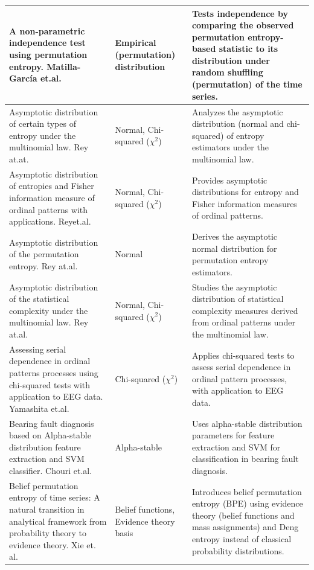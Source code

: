 \documentclass[12pt,a4paper]{article}
\begin{document}
\begin{longtable}{|p{5.5cm}|p{2.5cm}|p{6.5cm}|}
	A non-parametric independence test using permutation entropy. Matilla-García et.al.~\cite{MatillaGarcia2008} & Empirical (permutation) distribution & Tests independence by comparing the observed permutation entropy-based statistic to its distribution under random shuffling (permutation) of the time series.\\
	\hline
	Asymptotic distribution of certain types of entropy under the multinomial law. Rey at.at.~\cite{Rey2023} & Normal, Chi-squared ($\chi^2$) & Analyzes the asymptotic distribution (normal and chi-squared) of entropy estimators under the multinomial law. \\
	\hline
	Asymptotic distribution of entropies and Fisher information measure of ordinal patterns with applications. Reyet.al.~\cite{Rey2024} & Normal, Chi-squared ($\chi^2$) & Provides asymptotic distributions for entropy and Fisher information measures of ordinal patterns. \\
	\hline
	Asymptotic distribution of the permutation entropy. Rey at.al.~\cite{Rey2023a} & Normal & Derives the asymptotic normal distribution for permutation entropy estimators. \\
	\hline
	Asymptotic distribution of the statistical complexity under the multinomial law. Rey at.al.~\cite{Rey2025} & Normal, Chi-squared ($\chi^2$) & Studies the asymptotic distribution of statistical complexity measures derived from ordinal patterns under the multinomial law. \\
	\hline
	Assessing serial dependence in ordinal patterns processes using chi-squared tests with application to EEG data. Yamashita et.al.~\cite{YamashitaRiosDeSousa2022} & Chi-squared ($\chi^2$) & Applies chi-squared tests to assess serial dependence in ordinal pattern processes, with application to EEG data. \\
	\hline
	Bearing fault diagnosis based on Alpha-stable distribution feature extraction and SVM classifier. Chouri et.al.~\cite{Chouri2014} & Alpha-stable & Uses alpha-stable distribution parameters for feature extraction and SVM for classification in bearing fault diagnosis. \\
	\hline
	Belief permutation entropy of time series: A natural transition in analytical framework from probability theory to evidence theory. Xie et. al.~\cite{Xie2025} & Belief functions, Evidence theory basis & Introduces belief permutation entropy (BPE) using evidence theory (belief functions and mass assignments) and Deng entropy instead of classical probability distributions. \\

\end{longtable}
\end{document}
